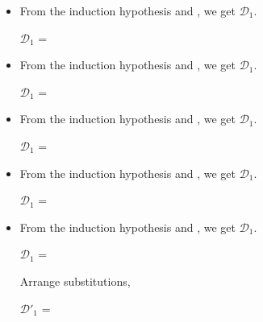 \begin{itemize}
	\item \QCsp
	      	      	      	      
	      From the induction hypothesis and \QCsp, we get $\mathcal{D}_1$.
	      	      	      	      
	      $\mathcal{D}_1$ = 
	      {}
	      	      	      	      
	\item \QRefl
	      	      	      	      
	      From the induction hypothesis and \QRefl, we get $\mathcal{D}_1$.
	      	      	      	      
	      $\mathcal{D}_1$ = 
	      {}
	      	      	      	      
	\item \QSym
	      	      	      	      
	      From the induction hypothesis and \QSym, we get $\mathcal{D}_1$.
	      	      	      	      
	      $\mathcal{D}_1$ = 
	      {}
	      	      	      	      
	\item \QTrans
	      	      	      	      
	      From the induction hypothesis and \QTrans, we get $\mathcal{D}_1$.
	      	      	      	      
	      $\mathcal{D}_1$ = 
	      { \andalso {}}
	      	      	      	      
	\item \QBeta
	      	      	      	      
	      From the induction hypothesis and \QBeta, we get $\mathcal{D}_1$.
	      	      	      	      
	      $\mathcal{D}_1$ = 
	      { \andalso {}}
	      	      	      	      
	      Arrange substitutions,
	      	      	      	      
	      $\mathcal{D}'_1$ = 
	      { \andalso {}}
	      	      	      	      

\end{itemize}
